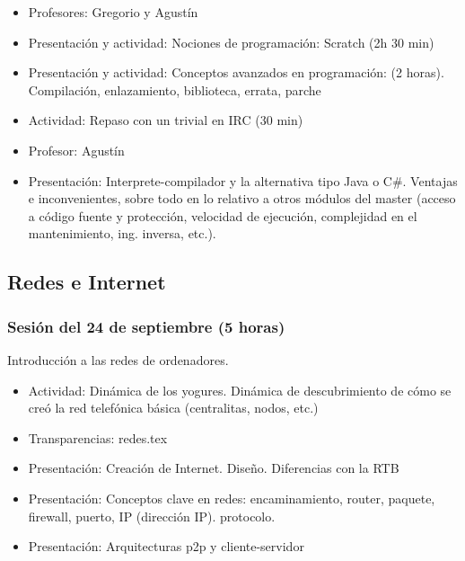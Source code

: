 \documentclass[a4paper,12pt]{article}
\begin{document}
\begin{itemize}
\item Profesores: Gregorio y Agustín
\item Presentación y actividad: Nociones de programación: Scratch (2h 30 min)

\item Presentación y actividad: Conceptos avanzados en programación: (2 horas). Compilación, enlazamiento, biblioteca, errata, parche

\item Actividad: Repaso con un trivial en IRC (30 min)

\end{itemize}

\begin{itemize}
\item Profesor: Agustín
\item Presentación: Interprete-compilador y la alternativa tipo Java o C\#. Ventajas e
inconvenientes, sobre todo en lo relativo a otros módulos del master (acceso a código fuente y protección, velocidad de ejecución, complejidad en el mantenimiento, ing. inversa, etc.).

\end{itemize}

\subsection{Redes e Internet}

\subsubsection{Sesión del 24 de septiembre (5 horas)}

Introducción a las redes de ordenadores. 

\begin{itemize}
\item Actividad: Dinámica de los yogures. Dinámica de descubrimiento de cómo se creó la red telefónica básica (centralitas, nodos, etc.)

\item Transparencias: redes.tex

\item Presentación: Creación de Internet. Diseño. Diferencias con la RTB

\item Presentación: Conceptos clave en redes: encaminamiento, router, paquete, firewall, puerto, IP (dirección IP). protocolo.

\item Presentación: Arquitecturas p2p y cliente-servidor
\end{itemize}
\end{document}
